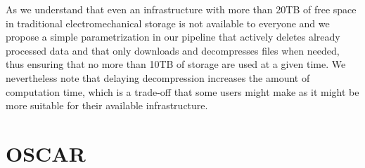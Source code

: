 As we understand that even an infrastructure with more than 20TB of free space in traditional electromechanical storage is not available to everyone and we propose a simple parametrization in our pipeline that actively deletes already processed data and that only downloads and decompresses files when needed, thus ensuring that no more than 10TB of storage are used at a given time. We nevertheless note that delaying decompression increases the amount of computation time, which is a trade-off that some users might make as it might be more suitable for their available infrastructure.

\section{OSCAR}

\begin{table*}[t!]
    \centering\tiny
\end{table*}
